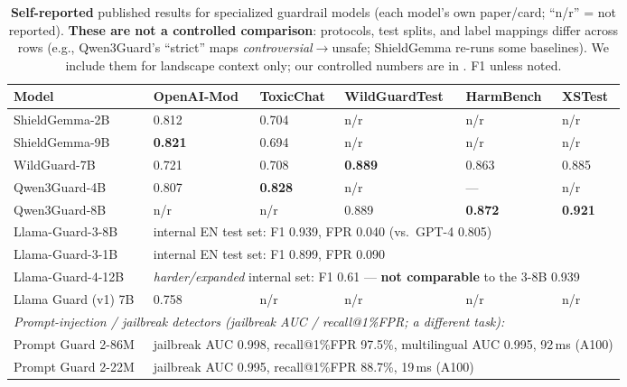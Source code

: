 \begin{table}[t]
\small\centering
\setlength{\tabcolsep}{4pt}
\caption{\textbf{Self-reported} published results for specialized guardrail models (each model's own paper/card; ``n/r'' = not reported). \textbf{These are not a controlled comparison}: protocols, test splits, and label mappings differ across rows (e.g., Qwen3Guard's ``strict'' maps \emph{controversial}$\to$unsafe; ShieldGemma re-runs some baselines). We include them for landscape context only; our controlled numbers are in . F1 unless noted.}
\label{tab:guardrail-published}
\begin{tabular}{llllll}
\toprule
Model & OpenAI-Mod & ToxicChat & WildGuardTest & HarmBench & XSTest \\
\midrule
ShieldGemma-2B~\cite{zeng2024shieldgemma} & 0.812 & 0.704 & n/r & n/r & n/r \\
ShieldGemma-9B~\cite{zeng2024shieldgemma} & \textbf{0.821} & 0.694 & n/r & n/r & n/r \\
WildGuard-7B~\cite{han2024wildguard} & 0.721 & 0.708 & \textbf{0.889} & 0.863 & 0.885 \\
Qwen3Guard-4B~\cite{qwen3guard2025} & 0.807 & \textbf{0.828} & n/r & --- & n/r \\
Qwen3Guard-8B~\cite{qwen3guard2025} & n/r & n/r & 0.889 & \textbf{0.872} & \textbf{0.921} \\
Llama-Guard-3-8B~\cite{meta2024llamaguard2_3} & \multicolumn{5}{l}{internal EN test set: F1 0.939, FPR 0.040 (vs.\ GPT-4 0.805)} \\
Llama-Guard-3-1B~\cite{fedorov2024llamaguard3_1b} & \multicolumn{5}{l}{internal EN test set: F1 0.899, FPR 0.090} \\
Llama-Guard-4-12B~\cite{meta2025llamaguard4} & \multicolumn{5}{l}{\emph{harder/expanded} internal set: F1 0.61 --- \textbf{not comparable} to the 3-8B 0.939} \\
Llama Guard (v1) 7B~\cite{inan2023llamaguard} & 0.758 & n/r & n/r & n/r & n/r \\
\midrule
\multicolumn{6}{l}{\emph{Prompt-injection / jailbreak detectors (jailbreak AUC / recall@1\%FPR; a different task):}} \\
Prompt Guard 2-86M~\cite{meta2025promptguard2} & \multicolumn{5}{l}{jailbreak AUC 0.998, recall@1\%FPR 97.5\%, multilingual AUC 0.995, 92\,ms (A100)} \\
Prompt Guard 2-22M~\cite{meta2025promptguard2} & \multicolumn{5}{l}{jailbreak AUC 0.995, recall@1\%FPR 88.7\%, 19\,ms (A100)} \\
\bottomrule
\end{tabular}
\end{table}

